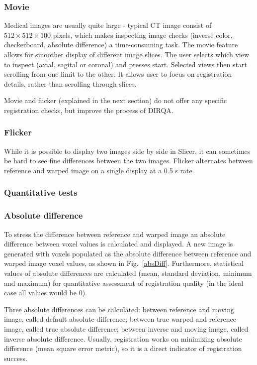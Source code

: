 \subsubsection{Movie}

Medical images are usually quite large - typical CT image consist of $512 \times 512 \times 100$ pixels, which makes inspecting image checks (inverse color, checkerboard, absolute difference) a time-consuming task. The movie feature allows for smoother display of different image slices. 
The user selects which view to inspect (axial, sagital or coronal) and presses start. Selected views then start scrolling from one limit to the other. It allows user to focus on registration details, rather than scrolling through slices.

Movie and flicker (explained in the next section) do not offer any specific registration checks, but improve the process of DIRQA.

\subsubsection{Flicker}

While it is possible to display two images side by side in Slicer, it can sometimes be hard to see fine differences between the two images. Flicker alternates between reference and warped image on a single display at a 0.5 s rate.

\subsubsection{Quantitative tests}

\subsubsection{Absolute difference}

To stress the difference between reference and warped image an absolute difference between voxel values is calculated and displayed. 
A new image is generated with voxels populated as the absolute difference between reference and warped image voxel values, as shown in Fig.~\ref{absDiff}.
Furthermore, statistical values of absolute differences are calculated (mean, standard deviation, minimum and maximum) 
for quantitative assessment of registration quality (in the ideal case all values would be 0).

Three absolute differences can be calculated: between reference and moving image, called default absolute difference; between true warped and reference image, called true absolute difference; between inverse and moving image, called
inverse absolute difference. Usually, registration works on minimizing absolute difference (mean square error metric), so it is a direct indicator
of registration success.

